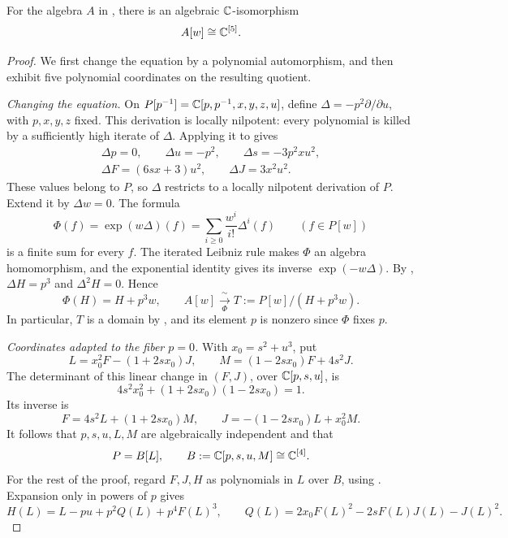 \begin{proposition}\label{prop:stabilization}
For the algebra \(A\) in , there is an algebraic
\(\mathbb C\)-isomorphism
\[
 A[w]\cong\mathbb C^{[5]}.
\]
\end{proposition}

\begin{proof}
We first change the equation by a polynomial automorphism, and then
exhibit five polynomial coordinates on the resulting quotient.

\smallskip
\noindent\emph{Changing the equation.}
On \(P[p^{-1}]=\mathbb C[p,p^{-1},x,y,z,u]\), define
\(\Delta=-p^2\partial/\partial u\), with \(p,x,y,z\) fixed.
This derivation is locally nilpotent: every polynomial is killed by a
sufficiently high iterate of \(\Delta\). Applying it to
 gives
\begin{equation}\label{con:derivation}
\begin{gathered}
 \Delta p=0,\qquad \Delta u=-p^2,\qquad
 \Delta s=-3p^2xu^2,\\
 \Delta F=(6sx+3)u^2,\qquad \Delta J=3x^2u^2.
\end{gathered}
\end{equation}
These values belong to \(P\), so \(\Delta\) restricts to a locally
nilpotent derivation of \(P\). Extend it by \(\Delta w=0\). The formula
\[
 \Phi(f)=\exp(w\Delta)(f)
       =\sum_{i\ge0}\frac{w^i}{i!}\Delta^i(f)
       \qquad(f\in P[w])
\]
is a finite sum for every \(f\). The iterated Leibniz rule makes \(\Phi\)
an algebra homomorphism, and the exponential identity gives its inverse
\(\exp(-w\Delta)\). By ,
\(\Delta H=p^3\) and \(\Delta^2H=0\). Hence
\begin{equation}\label{con:cylinder-automorphism}
 \Phi(H)=H+p^3w,\qquad
 A[w]\xrightarrow[\ \Phi\ ]{\ \sim\ }
 T:=P[w]/(H+p^3w).
\end{equation}
In particular, \(T\) is a domain by , and its element
\(p\) is nonzero since \(\Phi\) fixes \(p\).

\smallskip
\noindent\emph{Coordinates adapted to the fiber \(p=0\).}
With \(x_0=s^2+u^3\), put
\begin{equation}\label{con:linear-coordinates}
 L=x_0^2F-(1+2sx_0)J,\qquad
 M=(1-2sx_0)F+4s^2J.
\end{equation}
The determinant of this linear change in \((F,J)\), over
\(\mathbb C[p,s,u]\), is
\[
 4s^2x_0^2+(1+2sx_0)(1-2sx_0)=1.
\]
Its inverse is
\begin{equation}\label{con:linear-inverse}
 F=4s^2L+(1+2sx_0)M,\qquad
 J=-(1-2sx_0)L+x_0^2M.
\end{equation}
It follows that \(p,s,u,L,M\) are algebraically independent and that
\[
 P=B[L],\qquad B:=\mathbb C[p,s,u,M]\cong\mathbb C^{[4]}.
\]
For the rest of the proof, regard \(F,J,H\) as polynomials in \(L\)
over \(B\), using . Expansion only in powers
of \(p\) gives
\begin{equation}\label{con:h-expansion}
 H(L)=L-pu+p^2Q(L)+p^4F(L)^3,
 \qquad Q(L)=2x_0F(L)^2-2sF(L)J(L)-J(L)^2.
\end{equation}


\end{proof}
